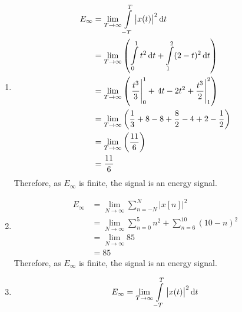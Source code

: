 \documentclass[fleqn, a4paper, 11pt, oneside]{amsart}
\theoremstyle{definition}
\theoremstyle{theorem}
\begin{document}
\begin{solution}
	\begin{enumerate}[leftmargin=*]
		\item
			\begin{align*}
				E_{\infty} & = \lim\limits_{T \to \infty} \int\limits_{-T}^{T} \left| x(t) \right|^2 \dif t                                                        \\
                                           & = \lim\limits_{T \to \infty} \left( \int\limits_{0}^{1} t^2 \dif t + \int\limits_{1}^{2} (2 - t)^2 \dif t \right)                     \\
                                           & = \lim\limits_{T \to \infty} \left( \left. \frac{t^3}{3} \right|_{0}^{1} + \left. 4 t - 2 t^2 + \frac{t^3}{2} \right|_{1}^{2} \right) \\
                                           & = \lim\limits_{T \to \infty} \left( \frac{1}{3} + 8 - 8 + \frac{8}{2} - 4 + 2 - \frac{1}{2} \right)                                   \\
                                           & = \lim\limits_{T \to \infty} \left( \frac{11}{6} \right)                                                                              \\
                                           & = \frac{11}{6}
			\end{align*}
			Therefore, as $E_{\infty}$ is finite, the signal is an energy signal.
		\item
			\begin{align*}
				E_{\infty} & = \lim\limits_{N \to \infty} \sum\limits_{n = -N}^{N} \left| x[n] \right|^2                    \\
                                           & = \lim\limits_{N \to \infty} \sum\limits_{n = 0}^{5} n^2 + \sum\limits_{n = 6}^{10} (10 - n)^2 \\
                                           & = \lim\limits_{N \to \infty} 85                                                                \\
                                           & = 85
			\end{align*}
			Therefore, as $E_{\infty}$ is finite, the signal is an energy signal.
		\item
			\begin{align*}
				E_{\infty} & = \lim\limits_{T \to \infty} \int\limits_{-T}^{T} \left| x(t) \right|^2 \dif t                                                        \\

\end{align*}
\end{enumerate}
\end{solution}
\end{document}

